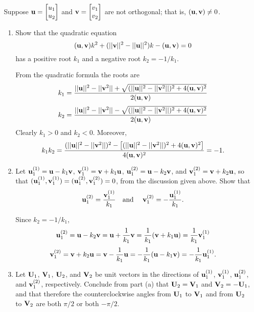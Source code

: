 \documentclass{ximera}
\begin{document}
 \begin{problem}\label{exer:10.6.28}
Suppose ${\bf u}=  \begin{bmatrix}u_1\\u_2\end{bmatrix}$ and ${\bf
v}=  \begin{bmatrix}v_1\\v_2\end{bmatrix}$ are not orthogonal; that is, $({\bf
u},{\bf v})\ne0$.
\begin{enumerate}
\item %
Show that  the quadratic equation
$$
({\bf u},{\bf v})k^2+(||{\bf v}||^2-||{\bf u}||^2)k-({\bf u},{\bf
v})=0
$$
has a positive root $k_1$ and a negative root $k_2=-1/k_1$.

\begin{solution}
    From the quadratic formula the roots are
$$
k_1=\frac{||{\bf u}||^2-||{\bf v}^2||+\sqrt{(||{\bf u}||^2-||{\bf
v}^2||)^2+4({\bf u},{\bf v})^2}}{2({\bf u},{\bf v})}
$$
$$
k_2=\frac{||{\bf u}||^2-||{\bf v}^2||-\sqrt{(||{\bf u}||^2-||{\bf
v}^2||)^2+4({\bf u},{\bf v})^2}}{2({\bf u},{\bf v})}
$$
Clearly $k_1>0$ and $k_2<0$. Moreover,
$$
k_1k_2=\frac{(||{\bf u}||^2-||{\bf v}^2||)^2-\left[(||{\bf u}||^2-||{\bf
v}^2||)^2+4({\bf u},{\bf v})^2\right]}{4({\bf u},{\bf v})^2}=-1.
$$
\end{solution}

\item %
Let ${\bf u}_1^{(1)}={\bf u}-k_1{\bf v}$, ${\bf v}_1^{(1)}={\bf
v}+k_1{\bf u}$, ${\bf u}_1^{(2)}={\bf u}-k_2{\bf v}$, and ${\bf
v}_1^{(2)}={\bf v}+k_2{\bf u}$, so that $({\bf u}_1^{(1)},{\bf
v}_1^{(1)}) =({\bf u}_1^{(2)},{\bf v}_1^{(2)})=0$, from the discussion
given above. Show that
$$
{\bf u}_1^{(2)}=\frac{{\bf v}_1^{(1)}}{ k_1}
\mbox{\quad and \quad}
{\bf v}_1^{(2)}=-\frac{{\bf u}_1^{(1)}}{ k_1}.
$$

\begin{solution}
    Since $k_2=-1/k_1$,
$$
{\bf u}_1^{(2)}={\bf u}-k_2{\bf v}={\bf u}+\frac{1}{k_1}{\bf
v}=\frac{1}{k_1}({\bf v}+k_1{\bf u})=\frac{1}{k_1}{\bf v}_1^{(1)}
$$
$$
{\bf v}_1^{(2)}={\bf v}+k_2{\bf u}={\bf v}-\frac{1}{k_1}{\bf
u}=-\frac{1}{k_1}({\bf u}-k_1{\bf v})=-\frac{1}{k_1}{\bf u}_1^{(1)}.
$$
\end{solution}

\item %
Let ${\bf U}_1$, ${\bf V}_1$, ${\bf U}_2$, and ${\bf V}_2$ be unit
vectors in the directions of ${\bf u}_1^{(1)}$, ${\bf v}_1^{(1)}$,
${\bf u}_1^{(2)}$, and ${\bf v}_1^{(2)}$, respectively. Conclude from
part (a) that ${\bf U}_2={\bf V}_1$ and ${\bf V}_2=-{\bf U}_1$, and
that therefore the counterclockwise angles from ${\bf U}_1$ to ${\bf
V}_1$ and from ${\bf U}_2$ to ${\bf V}_2$ are both $\pi/2$ or both
$-\pi/2$.
\end{enumerate}
\end{problem}
\end{document}

